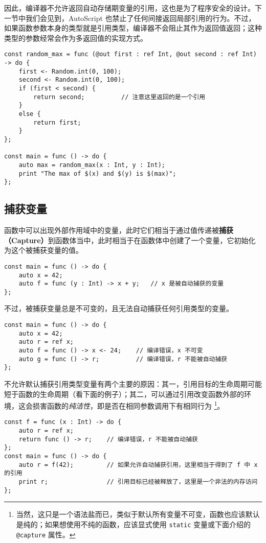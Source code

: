 因此，编译器不允许返回自动存储期变量的引用，这也是为了程序安全的设计。下一节中我们会见到，AutoScript 也禁止了任何间接返回局部引用的行为。不过，如果函数参数本身的类型就是引用类型，编译器不会阻止其作为返回值返回；这种类型的参数经常会作为多返回值的实现方式。

\begin{lstlisting}
const random_max = func (@out first : ref Int, @out second : ref Int) -> do {
	first <- Random.int(0, 100);
	second <- Random.int(0, 100);
	if (first < second) {
	    return second;			// 注意这里返回的是一个引用
	}
	else {
	    return first;
	}
};

const main = func () -> do {
    auto max = random_max(x : Int, y : Int);
    print "The max of $(x) and $(y) is $(max)";
};
\end{lstlisting}


\subsection{捕获变量}

函数中可以出现外部作用域中的变量，此时它们相当于通过值传递被\textbf{捕获（Capture）}到函数体当中，此时相当于在函数体中创建了一个变量，它初始化为这个被捕获变量的值。

\begin{lstlisting}
const main = func () -> do {
	auto x = 42;
	auto f = func (y : Int) -> x + y;	// x 是被自动捕获的变量
};
\end{lstlisting}

不过，被捕获变量总是不可变的，且无法自动捕获任何引用类型的变量。

\begin{lstlisting}
const main = func () -> do {
	auto x = 42;
	auto r = ref x;
	auto f = func () -> x <- 24;	// 编译错误，x 不可变
	auto g = func () -> r;			// 编译错误，r 不能被自动捕获
};
\end{lstlisting}

不允许默认捕获引用类型变量有两个主要的原因：其一，引用目标的生命周期可能短于函数的生命周期（看下面的例子）；其二，可以通过引用改变函数外部的环境，这会损害函数的\emph{纯洁性}，即是否在相同参数调用下有相同行为 \footnote{当然，这只是一个语法盐而已，类似于默认所有变量不可变，函数也应该默认是纯的；如果想使用不纯的函数，应该显式使用 \lstinline!static! 变量或下面介绍的 \lstinline!@capture! 属性。}。

\begin{lstlisting}
const f = func (x : Int) -> do {
	auto r = ref x;
	return func () -> r;	// 编译错误，r 不能被自动捕获
};
const main = func () -> do {
	auto r = f(42);			// 如果允许自动捕获引用，这里相当于得到了 f 中 x 的引用
	print r;				// 引用目标已经被释放了，这里是一个非法的内存访问
};
\end{lstlisting}

